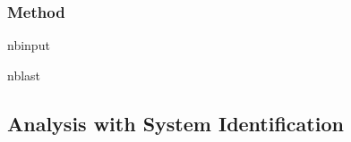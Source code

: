 \documentclass[letterpaper,10pt,english]{sphinxmanual}
\begin{document}
\subsubsection{Method}
\label{\detokenize{examples/02_SISO_Event:Method}}
\begin{sphinxuseclass}{nbinput}
\begin{sphinxuseclass}{nblast}
{
\begin{sphinxVerbatim}[commandchars=\\\{\}]
\llap{\color{nbsphinxin}[ ]:\,\hspace{\fboxrule}\hspace{\fboxsep}}  
   
\end{sphinxVerbatim}
}

\end{sphinxuseclass}
\end{sphinxuseclass}

\subsection{Analysis with System Identification}
\label{\detokenize{examples/02_SISO_Event:Analysis-with-System-Identification}}
\end{document}
